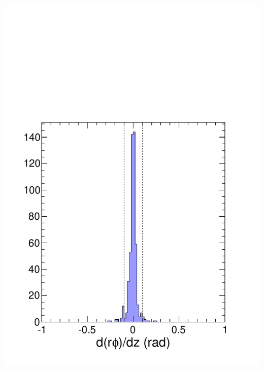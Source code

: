 \documentclass[compress]{beamer}
\begin{document}
\begin{frame}
\begin{columns}
\includegraphics[width=\linewidth]{tworuns_beampointing.pdf}


\end{columns}
\end{frame}
\end{document}
